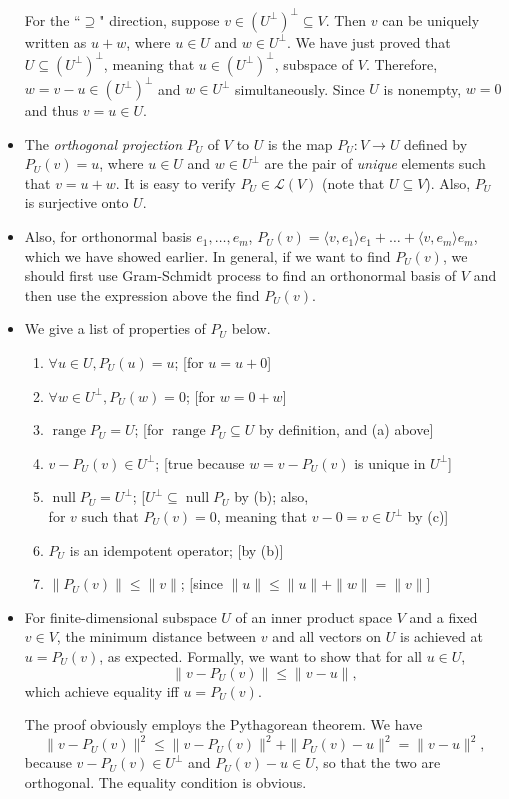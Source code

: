 \documentclass{article}
\newcommand{\n}{\operatorname{null}}
\renewcommand{\r}{\operatorname{range}}
\newcommand{\inp}[2]{\langle #1, #2 \rangle}
\newcommand{\nm}[1]{\| #1 \|}
\newcommand{\LV}{\mathcal{L}(V)}
\begin{document}
\begin{itemize}
    For the ``$\supseteq$" direction, suppose $v \in (U^\perp)^\perp \subseteq V$. Then $v$ can be uniquely written as $u+w$, where $u \in U$ and $w \in U^\perp$. We have just proved that $U \subseteq (U^\perp)^\perp$, meaning that $u \in (U^\perp)^\perp$, subspace of $V$. Therefore, $w = v-u \in (U^\perp)^\perp$ and $w \in U^\perp$ simultaneously. Since $U$ is nonempty, $w = 0$ and thus $v = u \in U$.
    \item The \textit{orthogonal projection} $P_U$ of $V$ to $U$ is the map $P_U: V \to U$ defined by $P_U(v) = u$, where $u \in U$ and $w \in U^\perp$ are the pair of \textit{unique} elements such that $v = u+w$. It is easy to verify $P_U \in \LV$ (note that $U \subseteq V$). Also, $P_U$ is surjective onto $U$.
    \item Also, for orthonormal basis $e_1,\dots,e_m$, $P_U(v) = \inp{v}{e_1}e_1+\dots+\inp{v}{e_m}e_m$, which we have showed earlier. In general, if we want to find $P_U(v)$, we should first use Gram-Schmidt process to find an orthonormal basis of $V$ and then use the expression above the find $P_U(v)$.
    \item We give a list of properties of $P_U$ below.
    \begin{enumerate}[label=(\alph*)]
        \item $\forall u \in U, P_U(u) = u$; [for $u = u+0$]
        \item $\forall w \in U^\perp, P_U(w) = 0$; [for $w = 0+w$]
        \item $\r P_U = U$; [for $\r P_U \subseteq U$ by definition, and (a) above]
        \item $v - P_U(v) \in U^\perp$; [true because $w = v - P_U(v)$ is unique in $U^\perp$]
        \item $\n P_U = U^\perp$; [$U^\perp \subseteq \n P_U$ by (b); also, \\ for $v$ such that $P_U(v) = 0$, meaning that $v - 0 = v \in U^\perp$ by (c)]
        \item $P_U$ is an idempotent operator; [by (b)]
        \item $\nm{P_U(v)} \leq \nm{v}$; [since $\nm{u} \leq \nm{u} + \nm{w} = \nm{v}$]
    \end{enumerate}
    \item For finite-dimensional subspace $U$ of an inner product space $V$ and a fixed $v \in V$, the minimum distance between $v$ and all vectors on $U$ is achieved at $u = P_U(v)$, as expected. Formally, we want to show that for all $u \in U$, $$\nm{v - P_U(v)} \leq \nm{v-u},$$ which achieve equality iff $u = P_U(v)$.
    
    The proof obviously employs the Pythagorean theorem. We have
    \begin{equation*}
        \nm{v - P_U(v)}^2 \leq \nm{v - P_U(v)}^2+\nm{P_U(v) - u}^2 = \nm{v - u}^2,
    \end{equation*}
    because $v - P_U(v) \in U^\perp$ and $P_U(v) - u \in U$, so that the two are orthogonal. The equality condition is obvious.
\end{itemize}
\end{document}
